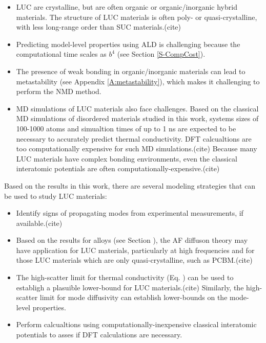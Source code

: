 \begin{itemize}
\item LUC are crystalline, but are often organic or 
organic/inorganic hybrid materials. The structure of LUC 
materials is often poly- or quasi-crystalline, with less 
long-range order than SUC materials.(cite) 

\item Predicting model-level properties  
using ALD is challenging because the computational time 
scales as $b^4$ (see Section \ref{S-CompCost}). 

\item The presence of weak bonding in organic/inorganic 
materials can lead to metastability 
(see Appendix \ref{A:metastability}), which  
makes it challenging to perform the NMD method. 

\item MD simulations of LUC materials also face challenges. 
Based on the classical MD simulations of disordered 
materials studied in this work, systems sizes of 100-1000 atoms 
and simualtion times of up to 1 ns are expected to be 
necessary to accurately predict thermal conductivity. DFT calcualtions 
are too computationally expensive for such MD simulations.(cite)
Because many LUC materials have complex bonding environments, 
even the classical interatomic 
potentials are often computationally-expensive.(cite)
\end{itemize}

Based on the results in this work, there are several 
modeling strategies that can be used to study LUC materials:

\begin{itemize}
\item Identify signs of propagating modes from experimental 
measurements, if available.(cite) 
\item Based on the results for alloys (see Section ), the AF 
diffuson theory may have application for LUC materials, particularly 
at high frequencies and for 
those LUC materials which are only quasi-crystalline, 
such as PCBM.(cite)
\item The high-scatter limit for thermal conductivity (Eq. ) 
can be used to establigh a plasuible lower-bound for LUC 
materials.(cite) Similarly, the 
high-scatter limit for mode diffusivity can establish 
lower-bounds on the mode-level properties. 
\item Perform calcualtions using computationally-inexpensive 
classical interatomic potentials to asses if DFT calculations 
are necessary. 
\end{itemize}


